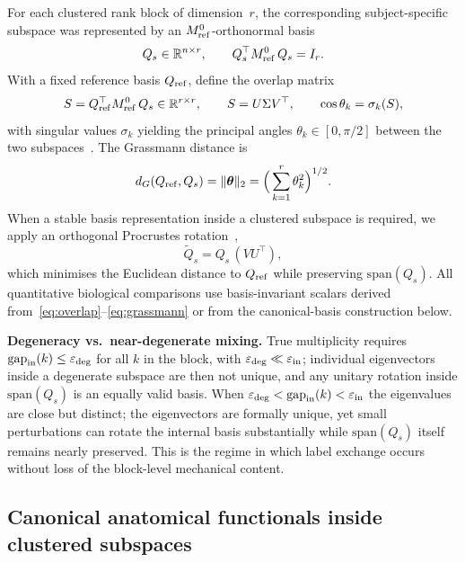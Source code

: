 \documentclass[11pt]{article}
\begin{document}
For each clustered rank block of dimension~$r$, the corresponding subject-specific subspace was represented by an $M_{\rm ref}^{0}$-orthonormal basis
\begin{equation}
Q_s\in\mathbb R^{n\times r},\qquad Q_s^\top M_{\rm ref}^{0}\,Q_s=I_r.
\end{equation}
With a fixed reference basis $Q_{\rm ref}$, define the overlap matrix
\begin{equation}
S=Q_{\rm ref}^\top M_{\rm ref}^{0}\,Q_s\in\mathbb R^{r\times r},\qquad S=U\Sigma V^\top,\qquad \cos\theta_k=\sigma_k(S),
\label{eq:overlap}
\end{equation}
with singular values $\sigma_k$ yielding the principal angles $\theta_k\in[0,\pi/2]$ between the two subspaces~\citep{BjorckGolub1973Angles}.
The Grassmann distance is
\begin{equation}
d_G(Q_{\rm ref},Q_s)=\|\boldsymbol\theta\|_2=\Big(\sum_{k=1}^{r}\theta_k^2\Big)^{1/2}.
\label{eq:grassmann}
\end{equation}
When a stable basis representation inside a clustered subspace is required, we apply an orthogonal Procrustes rotation~\citep{Schoenemann1966Procrustes},
\begin{equation}
\widetilde Q_s=Q_s\,(V U^\top),
\label{eq:procrustes}
\end{equation}
which minimises the Euclidean distance to $Q_{\rm ref}$ while preserving $\mathrm{span}(Q_s)$.
All quantitative biological comparisons use basis-invariant scalars derived from~\eqref{eq:overlap}--\eqref{eq:grassmann} or from the canonical-basis construction below.

\noindent\textbf{Degeneracy vs.\ near-degenerate mixing.}
True multiplicity requires $\mathrm{gap}_{\rm in}(k)\le\varepsilon_{\rm deg}$ for all $k$ in the block, with $\varepsilon_{\rm deg}\ll\varepsilon_{\rm in}$; individual eigenvectors inside a degenerate subspace are then not unique, and any unitary rotation inside $\mathrm{span}(Q_s)$ is an equally valid basis.
When $\varepsilon_{\rm deg}<\mathrm{gap}_{\rm in}(k)<\varepsilon_{\rm in}$ the eigenvalues are close but distinct; the eigenvectors are formally unique, yet small perturbations can rotate the internal basis substantially while $\mathrm{span}(Q_s)$ itself remains nearly preserved.
This is the regime in which label exchange occurs without loss of the block-level mechanical content.

\subsection{Canonical anatomical functionals inside clustered subspaces}
\label{sec:canonical-methods}
\end{document}
